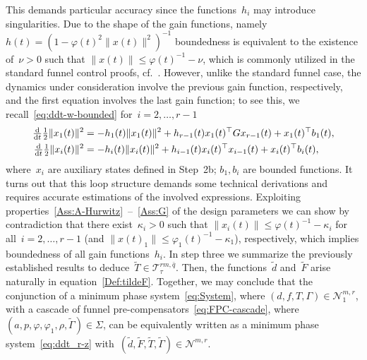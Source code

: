 \documentclass[ envcountsect, envcountsame]{svjour3}
\newcommand{\ddt}{\tfrac{\text{\normalfont d}}{\text{\normalfont d}t}}
\newcommand{\cN}{\mathcal{N}}
\newcommand{\cT}{\mathcal{T}}
\newcommand{\vp}{\varphi}
\begin{document}
This demands particular accuracy since the functions~$h_i$ may introduce singularities.
Due to the shape of the gain functions, namely~$h(t) = \left( 1 - \vp(t)^2\|x(t)\|^2 \right)^{-1}$ boundedness is equivalent to the existence of~$\nu > 0$ 
such that $\|x(t)\| \le \vp(t)^{-1} - \nu$, which is commonly utilized in the standard funnel control proofs, cf.~\cite[pp.~350-351]{BergLe18a}.
However, unlike the standard funnel case, the dynamics under consideration involve the previous gain function, respectively, and the first equation involves the last gain function; to see this, we recall~\eqref{eq:ddt-w-bounded} for~$i=2,\ldots,r-1$
\begin{equation*} %
\begin{aligned}
\ddt \tfrac{1}{2} \| x_1(t)\|^2 &= -h_1(t) \| x_1(t)\|^2 + h_{r-1}(t) x_1(t)^\top G x_{r-1}(t) + x_1(t)^\top b_1(t), \\
\ddt \tfrac{1}{2} \| x_{i}(t)\|^2 &= -h_i(t) \| x_{i}(t)\|^2 + h_{i-1}(t) x_{i}(t)^\top x_{i-1}(t) + x_{i}(t)^\top b_i(t),
\end{aligned}
\end{equation*}
where~$x_i$ are auxiliary states defined in Step~2b; $b_1,b_i$ are bounded functions.
It turns out that this loop structure demands some technical derivations and requires accurate estimations of the involved expressions.
Exploiting properties~\ref{Ass:A-Hurwitz}~--~\ref{Ass:G} of the design parameters we can show by contradiction that there exist~$\kappa_i > 0$ such that $\|x_i(t)\| \le \vp(t)^{-1} - \kappa_i$ for all~$i=2,\ldots,r-1$ (and $\|x(t)_1\| \le \vp_1(t)^{-1} - \kappa_1$), respectively, which implies boundedness of all gain functions~$h_i$.
In step three we summarize the previously established results to deduce~$\tilde T \in \cT^{rm,\bar q}_{\tau}$.
Then, the functions~$\tilde d$ and~$\tilde F$ arise naturally in equation~\eqref{Def:tildeF}.
Together, we may conclude that the conjunction of a minimum phase system~\eqref{eq:System}, where $(d,f,T,\Gamma) \in \cN^{m,r}_1$, 
with a cascade of funnel pre-compensators~\eqref{eq:FPC-cascade}, where~$(a,p,\vp,\vp_1,\rho, \tilde \Gamma) \in \Sigma$, can be equivalently written as a minimum phase system~\eqref{eq:ddt_r-z} with~$(\tilde d, \tilde F, \tilde T, \tilde \Gamma) \in \cN^{m,r}$.
%
\end{document}
